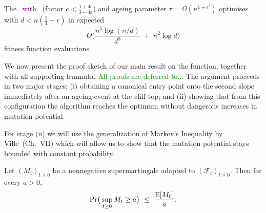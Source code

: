
\begin{theorem}\label{th:expoHD-cliff}
	The %
	\textcolor{purple}{\firstBest~with} \linHD\ (factor $c<\tfrac{1+4\varepsilon}{3-4\varepsilon}$) and ageing parameter $\tau=\Omega(n^{1+\epsilon'})$
	optimises \cliff{} with $d<n(\tfrac{1}{4}-\epsilon)$ in expected
	\[
	O\!\Big(\frac{n^{5}\log(n/d)}{d^{3}} \;+\; n^{2}\log d\Big)
	\]
	fitness function evaluations.
\end{theorem}


We now present the proof sketch of our main result on the  \cliff{} function, together with 
all supporting lemmata.  \textcolor{green}{All proofs are deferred to...} %
The argument proceeds in two 
major stages: (i) obtaining a canonical entry point onto the second slope 
immediately after an ageing event at the cliff-top; and (ii) showing that from 
this configuration the algorithm reaches the optimum without dangerous increases in mutation potential.

For stage (ii) we will use the generalization of Markov's Inequality by Ville~\cite{Doob1953}(Ch.~VII) which will allow us to show that the mutation potential stays bounded with constant probability.
\begin{theorem}\label{thm:ville}
	Let $(M_t)_{t\ge 0}$ be a nonnegative supermartingale adapted to $(\mathcal F_t)_{t\ge 0}$. 
	Then for every $a>0$,
	\[
	\Pr\!\big(\sup_{t\ge 0} M_t \ge a\big)\ \le\ \frac{\EE[M_0]}{a}.
	\]
\end{theorem}



